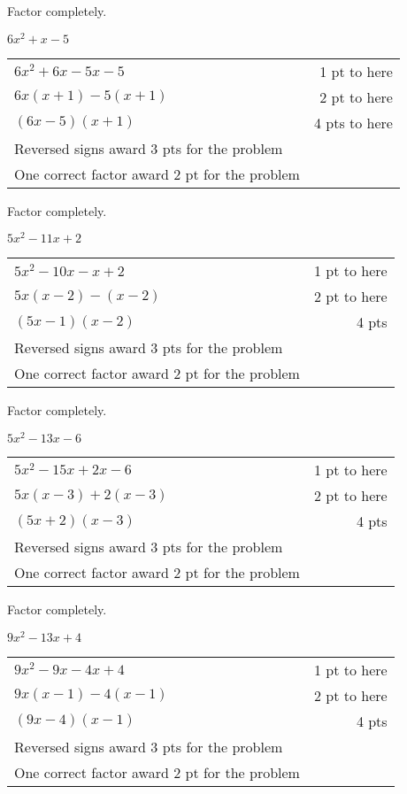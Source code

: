 {
	Factor completely.\par
	$6x^2+x-5$
}
{
	\begin{tabular}{l r}
	$6x^2+6x-5x-5$ & 1 pt to here\\
	$6x(x+1)-5(x+1)$ & 2 pt to here\\
	$(6x-5)(x+1)$ & 4 pts to here\\
	Reversed signs award 3 pts for the problem\\
	One correct factor award 2 pt for the problem
	\end{tabular}
}

{
	Factor completely.\par
	$5x^2-11x+2$
}
{
	\begin{tabular}{l r}
	$5x^2-10x-x+2$ & 1 pt to here\\
	$5x(x-2)-(x-2)$ & 2 pt to here\\
	$(5x-1)(x-2)$ & 4 pts\\
	Reversed signs award 3 pts for the problem\\
	One correct factor award 2 pt for the problem
	\end{tabular}
}

{
	Factor completely.\par
	$5x^2-13x-6$
}
{
	\begin{tabular}{l r}
	$5x^2-15x+2x-6$ & 1 pt to here\\
	$5x(x-3)+2(x-3)$ & 2 pt to here\\
	$(5x+2)(x-3)$ & 4 pts\\
	Reversed signs award 3 pts for the problem\\
	One correct factor award 2 pt for the problem
	\end{tabular}
}

{
	Factor completely.\par
	$9x^2-13x+4$
}
{
	\begin{tabular}{l r}
	$9x^2-9x-4x+4$ & 1 pt to here\\
	$9x(x-1)-4(x-1)$ & 2 pt to here\\
	$(9x-4)(x-1)$ & 4 pts\\
	Reversed signs award 3 pts for the problem\\
	One correct factor award 2 pt for the problem
	\end{tabular}
}
